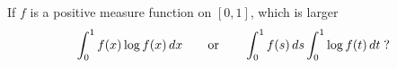 \begin{enumerate}
\begin{excopy}
If $f$ is a positive measure function on \([0,1]\), which is larger
\begin{equation*}
\int_0^1 f(x)\log f(x)\,dx 
\qquad \textnormal{or} \qquad
\int_0^1 f(s)\,ds \int_0^1 \log f(t)\,dt\; \textnormal{?} 
\end{equation*}
\end{excopy}


\end{enumerate}
